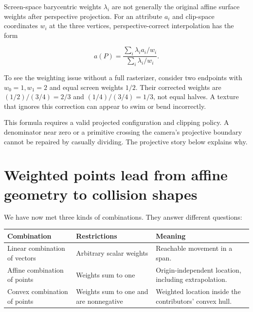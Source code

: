 \hypertarget{01-foundations-i-ch018-perspective-changes-the-interpolation-weights}{}

Screen-space barycentric weights \(\lambda_i\) are not generally the original affine surface weights after perspective projection. For an attribute \(a_i\) and clip-space coordinates \(w_i\) at the three vertices, perspective-correct interpolation has the form

\[
a(P)=\frac{\sum_i\lambda_i a_i/w_i}{\sum_i\lambda_i/w_i}.
\]

To see the weighting issue without a full rasterizer, consider two endpoints with \(w_0=1,w_1=2\) and equal screen weights \(1/2\). Their corrected weights are \((1/2)/(3/4)=2/3\) and \((1/4)/(3/4)=1/3\), not equal halves. A texture that ignores this correction can appear to swim or bend incorrectly.

This formula requires a valid projected configuration and clipping policy. A denominator near zero or a primitive crossing the camera's projective boundary cannot be repaired by casually dividing. The projective story below explains why.

\section{Weighted points lead from affine geometry to collision shapes}\label{01-foundations-i-ch018-weighted-points-lead-from-affine-geometry-to-collision-shapes}

\hypertarget{01-foundations-i-ch018-weighted-points-lead-from-affine-geometry-to-collision-shapes}{}

We have now met three kinds of combinations. They answer different questions:

{\def\LTcaptype{none} %
\begin{longtable}[]{@{}
  >{\raggedright\arraybackslash}p{}
  >{\raggedright\arraybackslash}p{}
  >{\raggedright\arraybackslash}p{}@{}}
\toprule\noalign{}
\begin{minipage}[b]{\linewidth}\raggedright
Combination
\end{minipage} & \begin{minipage}[b]{\linewidth}\raggedright
Restrictions
\end{minipage} & \begin{minipage}[b]{\linewidth}\raggedright
Meaning
\end{minipage} \\
\midrule\noalign{}
\endhead
\bottomrule\noalign{}
\endlastfoot
Linear combination of vectors & Arbitrary scalar weights & Reachable movement in a span. \\
Affine combination of points & Weights sum to one & Origin-independent location, including extrapolation. \\
Convex combination of points & Weights sum to one and are nonnegative & Weighted location inside the contributors' convex hull. \\
\end{longtable}
}

